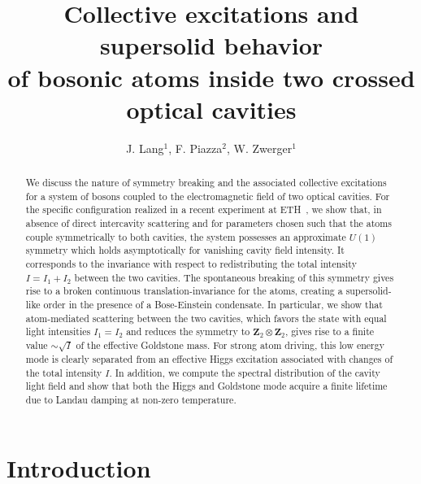 \documentclass[12pt]{iopart}
\begin{document}
\title[Collective excitations and supersolid behavior...]{Collective excitations and supersolid behavior  \\of bosonic
  atoms inside two crossed optical cavities}

\author{J. Lang$^1$, F. Piazza$^2$, W. Zwerger$^1$}
\address{$^1$Physik Department, Technische Universit\"at M\"unchen, 85747 Garching, Germany\\
$^2$Max-Planck Institute for the Physics of Complex Systems, N\"othnitzer Stra{\ss}e 38, 01187 Dresden, Germany }

\begin{abstract}
We discuss the nature of symmetry breaking and the associated
collective excitations for a system of bosons coupled to the electromagnetic 
field of two optical cavities. For the specific configuration realized in a recent experiment at 
ETH~\cite{leonard2016supersolid,leonard_supersolid_goldstone}, we show
that, in absence of direct intercavity scattering and for parameters chosen such
that the atoms couple symmetrically to both cavities, the system possesses an
approximate $U(1)$ symmetry which holds asymptotically for
vanishing cavity field intensity. It corresponds to the
invariance with respect to redistributing the total intensity
$I=I_1+I_2$ between the two cavities. The spontaneous
breaking of this symmetry gives rise to a broken continuous translation-invariance for the
atoms, creating a supersolid-like order in the presence of a Bose-Einstein condensate. In particular, we show 
that atom-mediated scattering between the two cavities, which favors the state with equal light intensities $I_1=I_2$ 
and reduces the symmetry to $\mathbf{Z}_2\otimes \mathbf{Z}_2$, gives rise to a finite value $\sim \sqrt{I}$ of the 
effective Goldstone mass. For strong atom driving, this low energy mode is clearly separated from 
an effective Higgs excitation associated with changes of the total intensity $I$.  
In addition, we compute the spectral distribution of the cavity light field and show that 
both the Higgs and Goldstone mode acquire a finite lifetime due to Landau damping at non-zero temperature. 
\end{abstract}

\maketitle


\section{Introduction}
{\color{red}}
\end{document}
